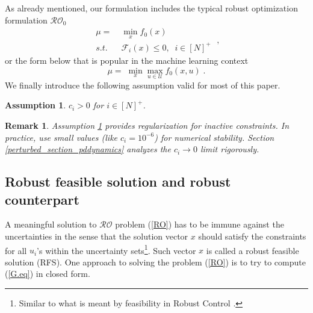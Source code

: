 \documentclass[journal,twoside,web]{ieeecolor}
\newcommand{\rev}[1]{\textcolor{revisionblue}{#1}}
\newtheorem{assumption}[theorem]{Assumption}
\newtheorem{remark}{Remark}
\begin{document}
As already mentioned, our formulation includes the typical robust optimization formulation $\mathcal{RO}_0$
\begin{equation}
\begin{array}{lcc}
\mu=&\;\displaystyle\min_x f_0(x)\\
s.t.&\; \mathcal{F}_i(x)\leq 0,\;\;i\in[N]^+
\end{array}\;,
\label{RO3}
\end{equation}
or the form below that is popular in the machine learning context \cite{rafique2022,zhang2021}
\begin{equation}
\mu=\;\displaystyle\min_x\max_{u\in \mathcal{U}} f_0(x,u)\;.
\end{equation}
We finally introduce the following assumption valid for most of this paper.

\begin{assumption} \label{assume_c>0}
$c_i > 0$ for $i\in[N]^+$.
\end{assumption}

\begin{remark}\label{active_inactive_constraint_rem} 
\rev{Assumption \ref{assume_c>0} provides regularization for inactive constraints. In practice, use small values (like $c_i = 10^{-6}$) for numerical stability. Section \ref{perturbed_section_pddynamics} analyzes the $c_i \to 0$ limit rigorously.}
\end{remark}

\subsection{\rev{Robust feasible solution and robust counterpart}}
A meaningful solution to $\mathcal{RO}$ problem (\ref{RO}) has to be immune against the uncertainties in the sense that the solution vector $x$ should satisfy the constraints for all $u_i$'s within the uncertainty sets\footnote{Similar to what is meant by feasibility in Robust Control \cite{zhou1995}.}. Such vector $x$ is called a robust feasible solution (RFS). One approach to solving the problem (\ref{RO}) is to try to compute (\ref{G.eq}) in closed form.
\end{document}
